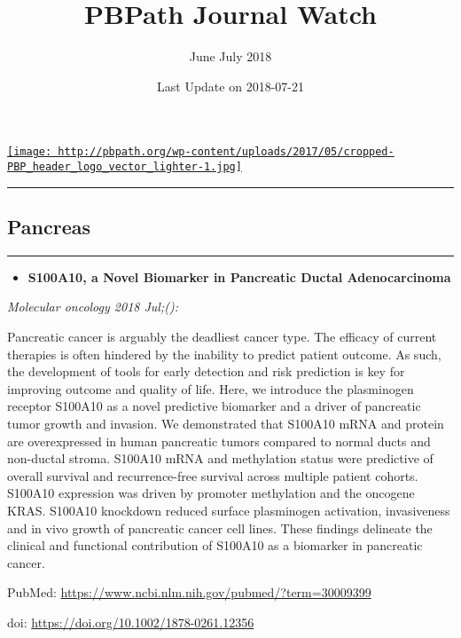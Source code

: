 \documentclass[]{article}
\title{PBPath Journal Watch}
\subtitle{June July 2018}
\author{}
\date{Last Update on 2018-07-21}
\providecommand{\tightlist}{%
  \setlength{\itemsep}{0pt}\setlength{\parskip}{0pt}}
\begin{document}
\maketitle

{
\setcounter{tocdepth}{2}
\tableofcontents
}
\href{http://pbpath.org/}{\texttt{[image: http://pbpath.org/wp-content/uploads/2017/05/cropped-PBP\_header\_logo\_vector\_lighter-1.jpg]}}

\begin{center}\rule{0.5\linewidth}{\linethickness}\end{center}

\hypertarget{pancreas}{%
\subsection{Pancreas}\label{pancreas}}

\begin{center}\rule{0.5\linewidth}{\linethickness}\end{center}

\begin{itemize}
\tightlist
\item
  \textbf{S100A10, a Novel Biomarker in Pancreatic Ductal
  Adenocarcinoma}
\end{itemize}

\emph{Molecular oncology 2018 Jul;():}

Pancreatic cancer is arguably the deadliest cancer type. The efficacy of
current therapies is often hindered by the inability to predict patient
outcome. As such, the development of tools for early detection and risk
prediction is key for improving outcome and quality of life. Here, we
introduce the plasminogen receptor S100A10 as a novel predictive
biomarker and a driver of pancreatic tumor growth and invasion. We
demonstrated that S100A10 mRNA and protein are overexpressed in human
pancreatic tumors compared to normal ducts and non-ductal stroma.
S100A10 mRNA and methylation status were predictive of overall survival
and recurrence-free survival across multiple patient cohorts. S100A10
expression was driven by promoter methylation and the oncogene KRAS.
S100A10 knockdown reduced surface plasminogen activation, invasiveness
and in vivo growth of pancreatic cancer cell lines. These findings
delineate the clinical and functional contribution of S100A10 as a
biomarker in pancreatic cancer.

PubMed: \url{https://www.ncbi.nlm.nih.gov/pubmed/?term=30009399}

doi: \url{https://doi.org/10.1002/1878-0261.12356}
\end{document}
